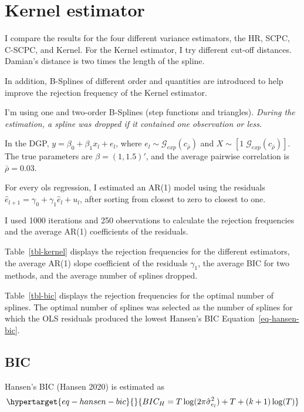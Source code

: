 \documentclass[
]{article}
\begin{document}
\hypertarget{sec-kernel}{%
\section{Kernel estimator}\label{sec-kernel}}

I compare the results for the four different variance estimators, the
HR, SCPC, C-SCPC, and Kernel. For the Kernel estimator, I try different
cut-off distances. Damian's distance is two times the length of the
spline.

In addition, B-Splines of different order and quantities are introduced
to help improve the rejection frequency of the Kernel estimator.

I'm using one and two-order B-Splines (step functions and triangles).
\emph{During the estimation, a spline was dropped if it contained one
observation or less.}

In the DGP, \(y=\beta_0 + \beta_1 x_l +e_l\), where
\(e_l\sim\mathcal{G}_{exp}(c_{\bar\rho})\) and
\(X\sim[1 \;\mathcal{G}_{exp}(c_{\bar\rho})]\). The true parameters are
\(\beta=(1, 1.5)'\), and the average pairwise correlation is
\(\bar\rho=0.03\).

For every ols regression, I estimated an AR(1) model using the residuals
\(\hat{e}_{l+1}=\gamma_0+\gamma_1 \hat{e}_l + u_l\), after sorting from
closest to zero to closest to one.

I used 1000 iterations and 250 observations to calculate the rejection
frequencies and the average AR(1) coefficients of the residuals.

Table~\ref{tbl-kernel} displays the rejection frequencies for the
different estimators, the average AR(1) slope coefficient of the
residuals \(\gamma_1\), the average BIC for two methods, and the average
number of splines dropped.

Table~\ref{tbl-bic} displays the rejection frequencies for the optimal
number of splines. The optimal number of splines was selected as the
number of splines for which the OLS residuals produced the lowest
Hansen's BIC Equation~\ref{eq-hansen-bic}.

\hypertarget{bic}{%
\subsection{BIC}\label{bic}}

Hansen's BIC (Hansen 2020) is estimated as
\begin{equation}\protect\hypertarget{eq-hansen-bic}{}{
BIC_H=T\log(2\pi\hat{\sigma}^2_{e_l})+T+(k+1)\log(T)
}\label{eq-hansen-bic}\end{equation}
\end{document}
